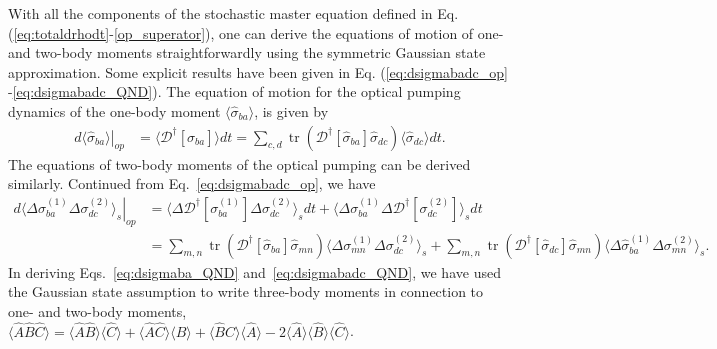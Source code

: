 \documentclass[preprint,aps,pra,onecolumn,superscriptaddress]{revtex4-1} %
\DeclareMathOperator{\tr}{tr}
\newcommand{\nn}{\nonumber}
\newcommand{\expect}[1]{\big\langle #1 \big\rangle}
\begin{document}
\begin{appendix}
With all the components of the stochastic master equation defined in Eq. (\ref{eq:totaldrhodt}-\ref{op_superator}), one can derive the equations of motion of one- and two-body moments straightforwardly using the symmetric Gaussian state approximation. Some explicit results have been given in Eq. (\ref{eq:dsigmabadc_op} -\ref{eq:dsigmabadc_QND}). The equation of motion for the optical pumping dynamics of the one-body moment $ \expect{\hat{\sigma}_{ba}} $, is given by
\begin{align}
\left.d\expect{\hat{\sigma}_{ba}}\right|_{op}&= \expect{\mathcal{D}^\dagger\left[\hat{\sigma}_{ba} \right]}dt=\sum_{c,d}\tr(\mathcal{D}^\dagger\left[\hat{\sigma}_{ba}\right]\hat{\sigma}_{dc} )\expect{\hat{\sigma}_{dc}}dt.\label{eq:dsigmaba_op_expand}
\end{align}
The equations of two-body moments of the optical pumping can be derived similarly. Continued from Eq.~\eqref{eq:dsigmabadc_op}, we have 
\begin{align}
\left.d\expect{\!\Delta \sigma_{ba}^{(\!1\!)}\Delta\sigma_{dc}^{(\!2\!)} }_s\right|_{op} &\!\!= \expect{\Delta\mathcal{D}^\dagger[ \sigma_{ba}^{(1)}]\Delta\sigma_{dc}^{(2)} }_sdt + \expect{\Delta \sigma_{ba}^{(1)} \Delta\mathcal{D}^\dagger[\sigma_{dc}^{(2)}] }_sdt\nn \\
&\!\!=\!\sum_{m,n}\! \tr\!\left(\mathcal{D}^\dagger[\hat{\sigma}_{ba} ]\hat{\sigma}_{mn} \right)\!\expect{\!\Delta\sigma_{mn}^{(\!1\!)}\Delta\sigma_{dc}^{(\!2\!)} }_s \!\!+\!\! \sum_{m,n}\!\tr\!\left(\mathcal{D}^\dagger[\hat{\sigma}_{dc}]\hat{\sigma}_{mn} \right)\!\expect{\!\Delta\hat{\sigma}_{ba}^{(\!1\!)}\Delta\sigma_{mn}^{(\!2\!)} }_s .\label{eq:dsigmabadc_op_expand}
\end{align} 
In deriving Eqs.~\eqref{eq:dsigmaba_QND} and~\eqref{eq:dsigmabadc_QND}, we have used the Gaussian state assumption to write three-body moments in connection to one- and two-body moments, $ \expect{\hat{A}\hat{B}\hat{C}}=\expect{\hat{A}\hat{B}}\expect{\hat{C}}+ \expect{\hat{A}\hat{C} }\expect{\hat{B}}+\expect{\hat{B}\hat{C} }\expect{\hat{A}}-2\expect{\hat{A}}\expect{\hat{B}}\expect{\hat{C}} $. 


\end{appendix}
\end{document}

